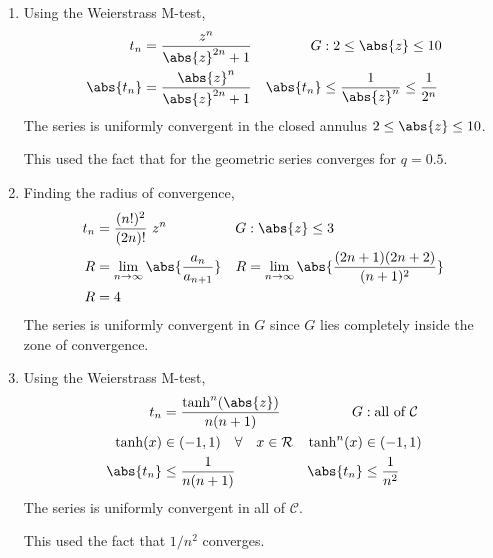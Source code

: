 \begin{enumerate}
    \item Using the Weierstrass M-test,
          \begin{align}
              t_n       & = \frac{z^{n}}{\abs{z}^{2n} + 1}            &
              G         & : 2 \leq  \abs{z} \leq 10                     \\
              \abs{t_n} & = \frac{\abs{z}^n}{\abs{z}^{2n} + 1}        &
              \abs{t_n} & \leq \frac{1}{\abs{z}^n} \leq \frac{1}{2^n}
          \end{align}
          The series \textcolor{y_h}{is uniformly convergent} in the closed annulus
          $ 2 \leq \abs{z} \leq 10 $. \par
          This used the fact that for the geometric series converges for $ q = 0.5 $.

    \item Finding the radius of convergence,
          \begin{align}
              t_n & = \frac{(n!)^2}{(2n)!}\ z^n                              &
              G   & : \abs{z} \leq 3                                           \\
              R   & = \lim_{n \to \infty} \abs{\frac{a_n}{a_{n+1}}}          &
              R   & = \lim_{n \to \infty} \abs{\frac{(2n+1)(2n+2)}{(n+1)^2}}   \\
              R   & = 4
          \end{align}
          The series \textcolor{y_h}{is uniformly convergent} in $ G $ since
          $ G $ lies completely inside the zone of convergence.

    \item Using the Weierstrass M-test,
          \begin{align}
              t_n        & = \frac{\tanh^n (\abs{z})}{n(n+1)}                &
              G          & : \text{all of}\ \mathcal{C}                        \\
              \tanh(x)   & \in (-1, 1) \quad \forall \quad x \in \mathcal{R} &
              \tanh^n(x) & \in (-1, 1)                                         \\
              \abs{t_n}  & \leq \frac{1}{n(n+1)}                             &
              \abs{t_n}  & \leq \frac{1}{n^2}
          \end{align}
          The series \textcolor{y_h}{is uniformly convergent} in all of $ \mathcal{C} $.
          \par
          This used the fact that $ 1/n^2 $ converges.


\end{enumerate}
